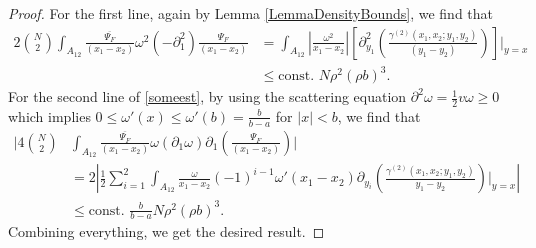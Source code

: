 \documentclass[a4paper,11pt]{article}
\newcommand{\abs}[1]{\left\lvert #1 \right\rvert}
\numberwithin{equation}{section}
\begin{document}
\begin{proof}
		For the first line, again by Lemma \ref{LemmaDensityBounds}, we find that \begin{equation}
			\begin{aligned}
				2\binom{N}{2}\int_{A_{12}}\frac{\overline{\Psi_F}}{(x_1-x_2)}\omega^2(-\partial^2_1)\frac{\Psi_F}{(x_1-x_2)}&=\int_{A_{12}}\abs{\frac{\omega^2}{x_1-x_2}}\left[\partial^2_{y_1}\left(\frac{\gamma^{(2)}(x_1,x_2;y_1,y_2)}{(y_1-y_2)}\right)\right]\Big\rvert_{y=x}\\&\leq\text{const. }N\rho^2 (\rho b)^3.
			\end{aligned}
		\end{equation}
		For the second line of \eqref{someest}, by using the scattering equation $ \partial^2\omega=\frac{1}{2}v\omega\geq0 $ which implies $ 0\leq\omega'(x)\leq \omega'(b)=\frac{b}{b-a} $ for $ \abs{x}<b $, we find that \begin{equation}
			\begin{aligned}
				\Bigg\lvert4\binom{N}{2}&\int_{A_{12}}\frac{\overline{\Psi_F}}{(x_1-x_2)}\omega(\partial_{1}\omega)\partial_1\left(\frac{\Psi_F}{(x_1-x_2)}\right)\Bigg\rvert\\&=2\abs{\frac12\sum_{i=1}^{2}\int_{A_{12}}\frac{\omega}{x_1-x_2}(-1)^{i-1}\omega'(x_1-x_2)\partial_{y_i}\left(\frac{\gamma^{(2)}(x_1,x_2;y_1,y_2)}{y_1-y_2}\right)\Bigg\rvert_{y=x}}\\
				&\leq \text{const. }\frac{b}{b-a}N\rho^2(\rho b)^3.
			\end{aligned}
		\end{equation}
		Combining everything, we get the desired result.
		
	\end{proof}
\end{document}
